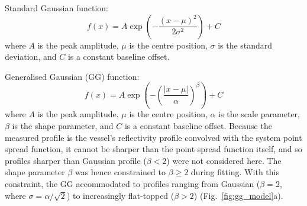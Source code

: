 Standard Gaussian function:
\begin{equation}
\label{eq:gaussian}
f(x) = A \exp\!\left(-\frac{{(x - \mu)}^2}{2\sigma^2}\right) + C
\end{equation}
where $A$ is the peak amplitude, $\mu$ is the centre position, $\sigma$ is the standard deviation, and $C$ is a constant baseline offset.

Generalised Gaussian (GG) function:
\begin{equation}
\label{eq:gen_gaussian}
f(x) = A \exp\!\left(-{\left(\frac{|x - \mu|}{\alpha}\right)}^{\!\beta}\right) + C
\end{equation}
where $A$ is the peak amplitude, $\mu$ is the centre position, $\alpha$ is the scale parameter, $\beta$ is the shape parameter, and $C$ is a constant baseline offset. Because the measured profile is the vessel's reflectivity profile convolved with the system point spread function, it cannot be sharper than the point spread function itself, and so profiles sharper than Gaussian profile ($\beta < 2$) were not considered here. The shape parameter $\beta$ was hence constrained to $\beta \geq 2$ during fitting. With this constraint, the GG accommodated to profiles ranging from Gaussian ($\beta = 2$, where $\sigma = \alpha / \sqrt{2}$) to increasingly flat-topped ($\beta > 2$) (Fig.~\ref{fig:gg_model}a).

